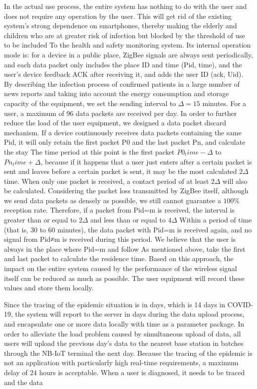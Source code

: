\documentclass[conference]{IEEEtran}
\begin{document}
\par In the actual use process, the entire system has nothing to do with the user and does not require any operation by the user. This will get rid of the existing system’s strong dependence on smartphones, thereby making the elderly and children who are at greater risk of infection but blocked by the threshold of use to be included To the health and safety monitoring system. Its internal operation mode is: for a device in a public place, ZigBee signals are always sent periodically, and each data packet only includes the place ID and time (Pid, time), and the user's device feedback ACK after receiving it, and adds the user ID (ack, Uid). By describing the infection process of confirmed patients in a large number of news reports and taking into account the energy consumption and storage capacity of the equipment, we set the sending interval to $\Delta=15$ minutes. For a user, a maximum of 96 data packets are received per day. In order to further reduce the load of the user equipment, we designed a data packet discard mechanism. If a device continuously receives data packets containing the same Pid, ​​it will only retain the first packet P0 and the last packet Pn, and calculate the stay The time period at this point is the first packet $P0_time-\Delta$ to $Pn_time+\Delta$, because if it happens that a user just enters after a certain packet is sent and leaves before a certain packet is sent, it may be the most calculated $2\Delta$ time. When only one packet is received, a contact period of at least $2\Delta$ will also be calculated. Considering the packet loss transmitted by ZigBee itself, although we send data packets as densely as possible, we still cannot guarantee a $100\%$ reception rate. Therefore, if a packet from Pid=m is received, the interval is greater than or equal to $2\Delta$ and less than or equal to $4\Delta$ Within a period of time (that is, 30 to 60 minutes), the data packet with Pid=m is received again, and no signal from Pid≠m is received during this period. We believe that the user is always in the place where Pid=m and follow As mentioned above, take the first and last packet to calculate the residence time. Based on this approach, the impact on the entire system caused by the performance of the wireless signal itself can be reduced as much as possible. The user equipment will record these values ​​and store them locally.
\par Since the tracing of the epidemic situation is in days, which is 14 days in COVID-19, the system will report to the server in days during the data upload process, and encapsulate one or more data locally with time as a parameter package. In order to alleviate the load problem caused by simultaneous upload of data, all users will upload the previous day's data to the nearest base station in batches through the NB-IoT terminal the next day. Because the tracing of the epidemic is not an application with particularly high real-time requirements, a maximum delay of 24 hours is acceptable. When a user is diagnosed, it needs to be traced and the data
\end{document}
